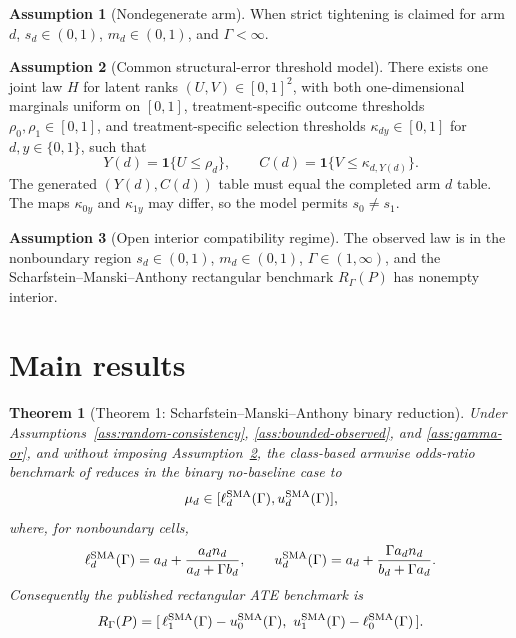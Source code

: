 \documentclass[11pt]{article}
\newcommand{\one}{\mathbf{1}}
\theoremstyle{definition}
\newtheorem{assumption}{Assumption}
\theoremstyle{plain}
\newtheorem{theorem}{Theorem}
\theoremstyle{remark}
\begin{document}
\begin{assumption}[Nondegenerate arm]\label{ass:nondegenerate}
When strict tightening is claimed for arm \(d\), \(s_d\in(0,1)\), \(m_d\in(0,1)\), and \(\Gamma<\infty\).
\end{assumption}

\begin{assumption}[Common structural-error threshold model]\label{ass:common-error}
There exists one joint law \(H\) for latent ranks \((U,V)\in[0,1]^2\), with both one-dimensional marginals uniform on \([0,1]\), treatment-specific outcome thresholds \(\rho_0,\rho_1\in[0,1]\), and treatment-specific selection thresholds \(\kappa_{dy}\in[0,1]\) for \(d,y\in\{0,1\}\), such that
\[
  Y(d)=\one\{U\le \rho_d\},\qquad
  C(d)=\one\{V\le \kappa_{d,Y(d)}\}.
\]
The generated \((Y(d),C(d))\) table must equal the completed arm \(d\) table.  The maps \(\kappa_{0y}\) and \(\kappa_{1y}\) may differ, so the model permits \(s_0\ne s_1\).
\end{assumption}

\begin{assumption}[Open interior compatibility regime]\label{ass:open-interior}
The observed law is in the nonboundary region \(s_d\in(0,1)\), \(m_d\in(0,1)\), \(\Gamma\in(1,\infty)\), and the Scharfstein--Manski--Anthony rectangular benchmark \(R_\Gamma(P)\) has nonempty interior.
\end{assumption}

\section{Main results}
\begin{theorem}[Theorem 1: Scharfstein--Manski--Anthony binary reduction]\label{thm:sma-reduction}
Under Assumptions~\ref{ass:random-consistency}, \ref{ass:bounded-observed}, and \ref{ass:gamma-or}, and without imposing Assumption~\ref{ass:common-error}, the class-based armwise odds-ratio benchmark of \citet{ScharfsteinManskiAnthony2004Bounds} reduces in the binary no-baseline case to
\[
  \mu_d\in[\ell_d^{\rm SMA}(\Gamma),u_d^{\rm SMA}(\Gamma)],
\]
where, for nonboundary cells,
\[
  \ell_d^{\rm SMA}(\Gamma)=a_d+\frac{a_dn_d}{a_d+\Gamma b_d},
  \qquad
  u_d^{\rm SMA}(\Gamma)=a_d+\frac{\Gamma a_dn_d}{b_d+\Gamma a_d}.
\]
Consequently the published rectangular ATE benchmark is
\[
  R_\Gamma(P)=
  [\,\ell_1^{\rm SMA}(\Gamma)-u_0^{\rm SMA}(\Gamma),\
  u_1^{\rm SMA}(\Gamma)-\ell_0^{\rm SMA}(\Gamma)\,].
\]
\end{theorem}
\end{document}
